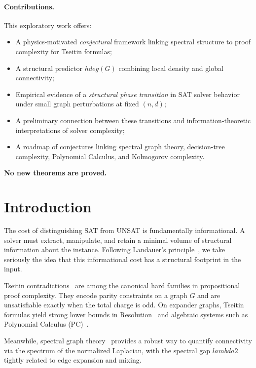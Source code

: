 \documentclass[11pt,a4paper]{article}
\def\gap{lambda2}%
\def\hdeg{hdeg}%
\theoremstyle{remark}
\newcommand{\gap}{\lambda_2}
\newcommand{\hdeg}{\widehat{\deg}}
\begin{document}
\paragraph{Contributions.}
This exploratory work offers:
\begin{itemize}
  \item A physics-motivated \emph{conjectural} framework linking spectral structure
        to proof complexity for Tseitin formulas;
  \item A structural predictor $\hdeg(G)$ combining local density and global connectivity;
  \item Empirical evidence of a \emph{structural phase transition} in SAT solver behavior
        under small graph perturbations at fixed $(n,d)$;
  \item A preliminary connection between these transitions and information-theoretic
        interpretations of solver complexity;
  \item A roadmap of conjectures linking spectral graph theory, decision-tree complexity,
        Polynomial Calculus, and Kolmogorov complexity.
\end{itemize}
\textbf{No new theorems are proved.}

\section{Introduction}

The cost of distinguishing SAT from UNSAT is fundamentally informational.
A solver must extract, manipulate, and retain a minimal volume of structural information
about the instance. Following Landauer's principle~\cite{Landauer1961}, we take seriously
the idea that this informational cost has a structural footprint in the input.

Tseitin contradictions~\cite{Tseitin1968,KrajicekBook} are among the canonical hard families
in propositional proof complexity. They encode parity constraints on a graph $G$ and are
unsatisfiable exactly when the total charge is odd. On expander graphs, Tseitin formulas
yield strong lower bounds in Resolution~\cite{BenSassonWigderson2001} and algebraic systems
such as Polynomial Calculus (PC)~\cite{Razborov1998}.

Meanwhile, spectral graph theory~\cite{Chung1997,HooryLinialWigderson} provides a robust way
to quantify connectivity via the spectrum of the normalized Laplacian, with the spectral gap
$\gap$ tightly related to edge expansion and mixing.
\end{document}
